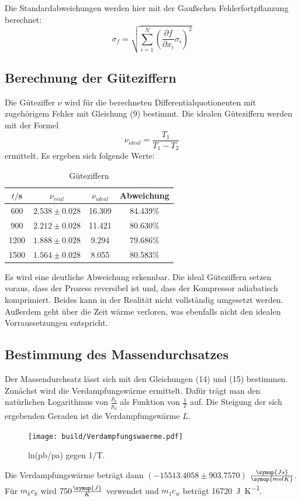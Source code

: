 Die Standardabweichungen werden hier mit der Gaußschen Fehlerfortpflanzung berechnet: \\
\begin{equation}
  \sigma_f = \sqrt{
    \sum\limits_{i = 1}^N
      \left( \frac{\partial f}{\partial x_i} \sigma_i \right)^{\!\! 2}
    }
\end{equation}
\subsection{Berechnung der Güteziffern}
Die Güteziffer $\nu$ wird für die berechneten Differentialquotionenten mit zugehörigem Fehler mit Gleichung (9) bestimmt.
Die idealen Güteziffern werden mit der Formel
\begin{equation}
  \nu_{ideal} = \frac{T_1}{T_1-T_2}
\end{equation}
ermittelt. Es ergeben sich folgende Werte:
\begin{table}
  \centering
  \caption{Güteziffern}
  \label{tab:Reale und ideale Güteziffern}
  \begin{tabular}{c c c c}
    \toprule
    $t/$s & $\nu_{real}$ & $\nu_{ideal}$ & Abweichung \\
    \midrule
     600 & $2.538 \pm 0.028$ &   16.309 &  84.439\% \\
     900 & $2.212 \pm 0.028$ &   11.421 &  80.630\% \\
    1200 & $1.888 \pm 0.028$ &    9.294 &  79.686\% \\
    1500 & $1.564 \pm 0.028$ &    8.055 &  80.583\% \\
    \bottomrule
  \end{tabular}
\end{table}

Es wird eine deutliche Abweichung erkennbar. Die ideal Güteziffern setzen
voraus, dass der Prozess reversibel ist und, dass der Kompressor adiabatisch
komprimiert. Beides kann in der Realität nicht vollständig umgesetzt werden. Außerdem
geht über die Zeit wärme verloren, was ebenfalls nicht den idealen Vorraussetzungen entspricht.
\subsection{Bestimmung des Massendurchsatzes}
Der Massendurchsatz lässt sich mit den Gleichungen (14) und (15) bestimmen. Zunächst
wird die Verdampfungswärme ermittelt. Dafür trägt man den natürlichen Logarithmus von
$\frac{p_b}{p_0}$ als Funktion von $\frac{1}{T}$ auf. Die Steigung der sich ergebenden
Geraden ist die Verdampfungswärme $L$.
\begin{figure}[H]
  \centering
  \texttt{[image: build/Verdampfungswaerme.pdf]}
  \caption{ln(pb/pa) gegen 1/T.}
  \label{fig:Verdampfungswaerme}
\end{figure}
Die Verdampfungswärme beträgt dann $(-15513.4058 \pm 903.7570)$ $\frac{\symup{Js}}{\symup{molK}}$.
Für $m_kc_k$ wird $750 \frac{\symup{J}}{K}$ verwendet und $m_1c_w$ beträgt \SI{16720}{\joule\per\kelvin}.
